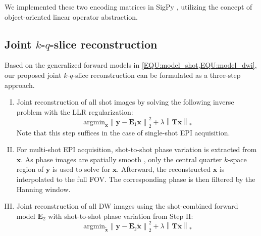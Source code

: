 \documentclass[preprint,12pt,authoryear,review]{elsarticle}
\begin{document}
	We implemented these two encoding matrices in SigPy \citep{ong_2019_sigpy},
	utilizing the concept of object-oriented linear operator abstraction.


	\subsection{Joint $k$-$q$-slice reconstruction}

	Based on the generalized forward models in \cref{EQU:model_shot,EQU:model_dwi},
	our proposed joint $k$-$q$-slice reconstruction can be formulated as a three-step approach.

	\begin{enumerate}[I.]
		\item Joint reconstruction of all shot images
		by solving the following inverse problem with
		the LLR regularization:
		\begin{equation}
			\mathrm{argmin}_\mathbf{x} \left\| \mathbf{y} - \mathbf{E}_1 \mathbf{x} \right\|_2^2
			+ \lambda \left\| \mathbf{T} \mathbf{x} \right\|_*
			\label{EQU:solve_shot}
		\end{equation}
            Note that this step suffices in the case of single-shot EPI acquisition.

		\item For multi-shot EPI acquisition,
		shot-to-shot phase variation is extracted from $\mathbf{x}$.
		As phase images are spatially smooth \citep{chen_2013_muse,dai_2023_julep},
		only the central quarter $k$-space region of $\mathbf{y}$
		is used to solve for $\mathbf{x}$.
            Afterward, the reconstructed $\mathbf{x}$ is interpolated to the full FOV.
            The corresponding phase is then filtered by the Hanning window.

		\item Joint reconstruction of all DW images using
		the shot-combined forward model $\mathbf{E}_2$
		with shot-to-shot phase variation from Step II:
		\begin{equation}
			\mathrm{argmin}_\mathbf{\tilde{x}} \left\| \mathbf{y} - \mathbf{E}_2 \mathbf{\tilde{x}} \right\|_2^2
			+ \lambda \left\| \mathbf{T} \mathbf{\tilde{x}} \right\|_*
			\label{EQU:solve_dwi}
		\end{equation}
	\end{enumerate}
\end{document}
